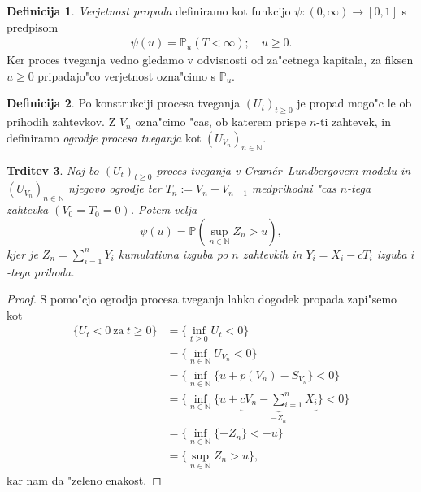 \documentclass[12pt, a4paper, reqno]{amsart}
\theoremstyle{definition}
\newtheorem{definicija}{Definicija}[section]
\theoremstyle{plain}
\newtheorem{trditev}[definicija]{Trditev}
\newcommand{\N}{\mathbb{N}}
\newcommand{\Prob}{\mathbb{P}}
\newcommand{\1}{\mathds{1}}
\begin{document}
        \begin{definicija}
            \textit{Verjetnost propada} definiramo kot funkcijo $\psi: (0,\infty) \to [0,1]$ 
            s predpisom
            \begin{align*}
                \psi(u) = \Prob_u(T<\infty); \quad u\geq0.
            \end{align*}
            Ker proces tveganja vedno gledamo 
            v odvisnosti od  za"cetnega kapitala, za fiksen $u\geq0$ pripadajo"co verjetnost
            ozna"cimo s $\Prob_u$.
            \label{def:VerjetnostPropada}
        \end{definicija}

        \begin{definicija}
            Po konstrukciji procesa tveganja $(U_t)_{t\geq0}$ je propad mogo"c le ob 
            prihodih zahtevkov. %
            Z $V_n$ ozna"cimo "cas, ob katerem prispe $n$-ti zahtevek, in definiramo 
            \textit{ogrodje procesa tveganja} kot $(U_{V_n})_{n\in\N}$.
            \label{def:ogrodjeProcesaTveganja}
        \end{definicija}

        \begin{trditev}
            Naj bo $(U_t)_{t\geq0}$ proces tveganja v Cramér--Lundbergovem modelu in $(U_{V_n})_{n\in\N}$ 
            njegovo ogrodje ter $T_n := V_n - V_{n-1}$ medprihodni "cas $n$-tega zahtevka 
            $(V_0 = T_0 = 0)$. Potem velja 
            \begin{equation*}
                \psi(u) = \Prob\left(\sup_{n\in\N}Z_n > u\right),
            \end{equation*}
            kjer je $Z_n = \sum_{i=1}^nY_i$  kumulativna izguba po $n$ zahtevkih in $Y_i = X_i - cT_i$
            izguba $i$-tega prihoda.
            \label{trd:verjetnostPropadaZOgrodjem}
        \end{trditev}

        \begin{proof}

            S pomo"cjo ogrodja procesa tveganja lahko dogodek propada zapi"semo kot
            \begin{align*}
                \bigl\{U_t<0 \ \text{za} \ t\geq 0\bigr\} &= 
                                \biggl\{\inf_{t\geq0}U_t<0\biggr\} \\
                              &= \biggl\{\inf_{n\in\N}U_{V_n}<0\biggr\} \\
                              &= \biggl\{\inf_{n\in\N}\bigl\{u + p(V_n) - S_{V_n}\bigr\} < 0\biggr\} \\
                              &= \biggl\{\inf_{n\in\N}\biggl\{u + 
                              \underbrace{cV_n - \sum_{i=1}^nX_i}_{-Z_n}\biggr\} < 0\biggr\} \\
                              &= \biggl\{\inf_{n\in\N}\{-Z_n\} < -u\biggr\} \\
                              &= \biggl\{\sup_{n\in\N}Z_n > u\biggr\},
            \end{align*}
            kar nam da "zeleno enakost.
        \end{proof}
\end{document}
